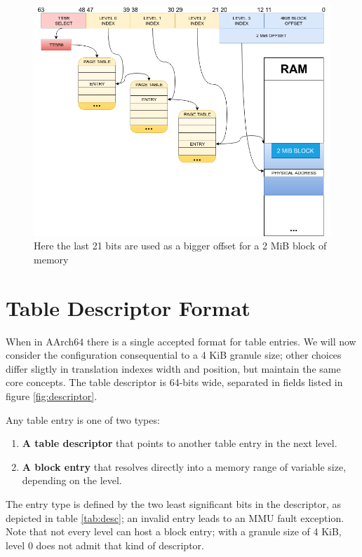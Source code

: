 \documentclass[12pt,a4paper,openright,twoside]{report}
\begin{document}
 \begin{figure}[h]
 \includegraphics[scale=0.48]{images/tesi16.png} 
 \caption[Address Translation Example]{ Here the last 21 bits are
 used as a bigger offset for a 2 MiB block of memory}\label{fig:translation2}
 \end{figure}

\section{Table Descriptor Format}
When in AArch64 there is a single accepted format for table entries. We will now
consider the configuration consequential to a 4 KiB granule size; other choices
differ sligtly in translation indexes width and position, but maintain the same
core concepts. The table descriptor is 64-bits wide, separated in fields listed 
in figure \ref{fig:descriptor}.

Any table entry is one of two types:
\begin{enumerate}
    \item \textbf{A table descriptor} that points to another table entry in the 
        next level.
    \item \textbf{A block entry} that resolves directly into a memory range of 
        variable size, depending on the level.
\end{enumerate}

The entry type is defined by the two least significant bits in the descriptor, 
as depicted in table \ref{tab:desc}; an invalid entry leads to an MMU fault exception.
Note that not every level can host a block entry; with a granule size of 4 KiB, 
level 0 does not admit that kind of descriptor.
\end{document}
